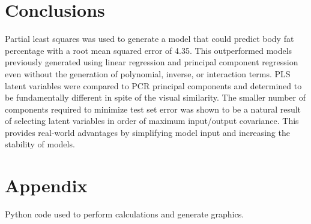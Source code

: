 \documentclass{IEEEtran}
\begin{document}
\section{Conclusions}

Partial least squares was used to generate a model that could predict body fat percentage with a root mean squared error of \num{4.35}. This outperformed models previously generated using linear regression and principal component regression even without the generation of polynomial, inverse, or interaction terms. PLS latent variables were compared to PCR principal components and determined to be fundamentally different in spite of the visual similarity. The smaller number of components required to minimize test set error was shown to be a natural result of selecting latent variables in order of maximum input/output covariance. This provides real-world advantages by simplifying model input and increasing the stability of models.

\printbibliography

\onecolumn
\section{Appendix}
Python code used to perform calculations and generate graphics.
\lstset{frame=single}

\end{document}
